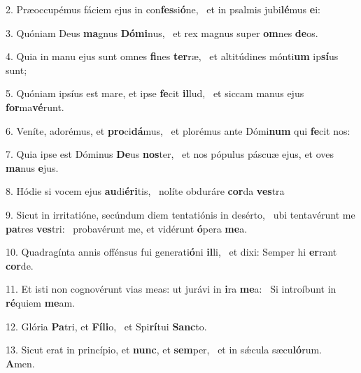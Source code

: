 2. Præoccupémus fáciem ejus in con\textbf{fes}si\textbf{ó}ne, \ast\  et in psalmis jubi\textbf{lé}mus \textbf{e}i:\

3. Quóniam Deus \textbf{ma}gnus \textbf{Dó}\textbf{mi}nus, \ast\  et rex magnus super \textbf{om}nes \textbf{de}os.\

4. Quia in manu ejus sunt omnes \textbf{fi}nes \textbf{ter}ræ, \ast\  et altitúdines mónti\textbf{um} ip\textbf{sí}us sunt;\

5. Quóniam ipsíus est mare, et ipse \textbf{fe}cit \textbf{il}lud, \ast\  et siccam manus ejus \textbf{for}ma\textbf{vé}runt.\

6. Veníte, adorémus, et \textbf{pro}ci\textbf{dá}mus, \ast\  et plorémus ante Dómi\textbf{num} qui \textbf{fe}cit nos:\

7. Quia ipse est Dóminus \textbf{De}us \textbf{nos}ter, \ast\  et nos pópulus páscuæ ejus, et oves \textbf{ma}nus \textbf{e}jus.\

8. Hódie si vocem ejus \textbf{au}di\textbf{é}\textbf{ri}tis, \ast\  nolíte obduráre \textbf{cor}da \textbf{ves}tra\

9. Sicut in irritatióne, secúndum diem tentatiónis in desérto, \dag\  ubi tentavérunt me \textbf{pa}tres \textbf{ves}tri: \ast\  probavérunt me, et vidérunt \textbf{ó}pera \textbf{me}a.\

10. Quadragínta annis offénsus fui generati\textbf{ó}ni \textbf{il}li, \ast\  et dixi: Semper hi \textbf{er}rant \textbf{cor}de.\

11. Et isti non cognovérunt vias meas: ut jurávi in \textbf{i}ra \textbf{me}a: \ast\  Si introíbunt in \textbf{ré}quiem \textbf{me}am.\

12. Glória \textbf{Pa}tri, et \textbf{Fí}\textbf{li}o, \ast\  et Spi\textbf{rí}tui \textbf{Sanc}to.\

13. Sicut erat in princípio, et \textbf{nunc}, et \textbf{sem}per, \ast\  et in sǽcula sæcu\textbf{ló}rum. \textbf{A}men.\

